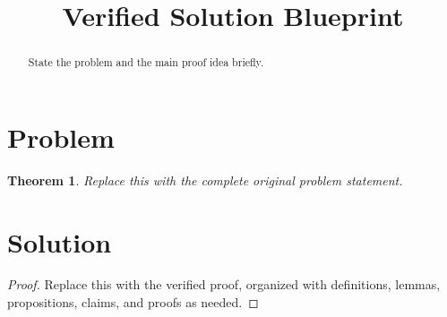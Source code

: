 \documentclass[11pt]{amsart}
\title{Verified Solution Blueprint}
\author{}
\date{}
\theoremstyle{plain}
\newtheorem{theorem}{Theorem}[section]
\theoremstyle{definition}
\theoremstyle{remark}
\begin{document}
\maketitle

\begin{abstract}
State the problem and the main proof idea briefly.
\end{abstract}


\section{Problem}

\begin{theorem}
Replace this with the complete original problem statement.
\end{theorem}

\section{Solution}

\begin{proof}
Replace this with the verified proof, organized with definitions, lemmas,
propositions, claims, and proofs as needed.
\end{proof}
\end{document}
